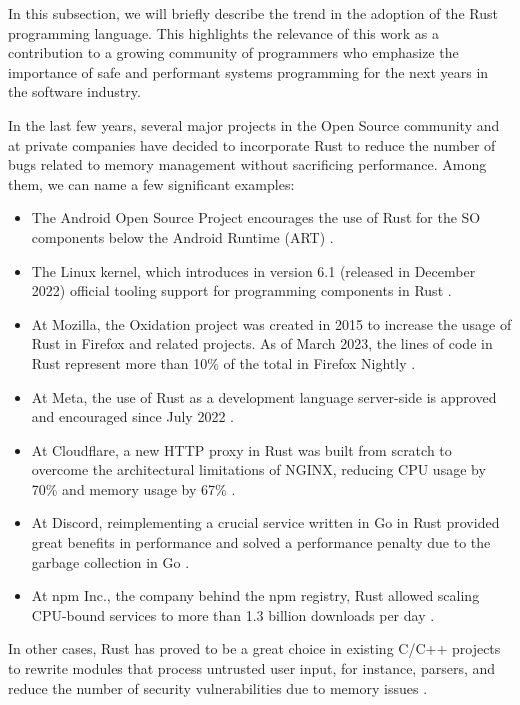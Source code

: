 In this subsection, we will briefly describe the trend in the adoption of the Rust programming language.
This highlights the relevance of this work as a contribution to a growing community of programmers
who emphasize the importance of safe and performant systems programming for the next years in the software industry.

In the last few years, several major projects in the Open Source community and at private companies have decided
to incorporate Rust to reduce the number of bugs related to memory management without sacrificing performance.
Among them, we can name a few significant examples:

\begin{itemize}
    \item The Android Open Source Project encourages the use of Rust for the SO components below the Android Runtime (ART) \cite{stoep2021}.
    \item The Linux kernel, which introduces in version 6.1 (released in December 2022) official tooling support
          for programming components in Rust \cite{corbet2022,desimone2022}.
    \item At Mozilla, the Oxidation project was created in 2015 to increase the usage of Rust in Firefox and related projects.
          As of March 2023, the lines of code in Rust represent more than 10\% of the total in Firefox Nightly \cite{mozilla-oxidation}.
    \item At Meta, the use of Rust as a development language server-side
          is approved and encouraged since July 2022 \cite{garcia2022}.
    \item At Cloudflare, a new HTTP proxy in Rust was built from scratch to overcome the architectural limitations
          of NGINX, reducing CPU usage by 70\% and memory usage by 67\% \cite{wu2022}.
    \item At Discord, reimplementing a crucial service written in Go in Rust provided great benefits in performance
          and solved a performance penalty due to the garbage collection in Go \cite{howarth2020}.
    \item At npm Inc., the company behind the npm registry, Rust allowed scaling CPU-bound services
          to more than 1.3 billion downloads per day \cite{rust-npm-case-study}.
\end{itemize}

In other cases, Rust has proved to be a great choice in existing C/C++ projects to rewrite modules
that process untrusted user input, for instance, parsers,
and reduce the number of security vulnerabilities due to memory issues \cite{chifflier2017writing}.

